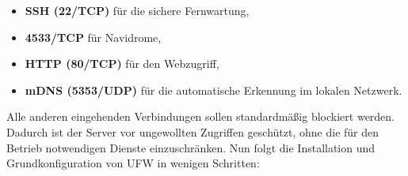 \documentclass[12pt,a4paper]{report}
\begin{document}
  \begin{itemize}
    \item \textbf{\ac{SSH} (22/\ac{TCP})} für die sichere Fernwartung,
    \item \textbf{4533/\ac{TCP}} für Navidrome,
    \item \textbf{\ac{HTTP} (80/\ac{TCP})} für den Webzugriff,
    \item \textbf{\acs{mDNS} (5353/\ac{UDP})} für die automatische Erkennung im lokalen Netzwerk.
  \end{itemize}

  Alle anderen eingehenden Verbindungen sollen standardmäßig blockiert werden. 
  Dadurch ist der Server vor ungewollten Zugriffen geschützt, ohne die für den Betrieb notwendigen Dienste einzuschränken. 
  Nun folgt die Installation und Grundkonfiguration von \ac{UFW} in wenigen Schritten:
\end{document}

